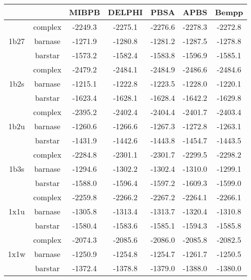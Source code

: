 \documentclass[11pt]{article}
\begin{document}
\begin{table*}[]
     \centering
     \begin{tabular}{cc|c|c|c|c|c}
                           &         & MIBPB   & DELPHI  & PBSA    & APBS    & Bempp   \\ \hline
     \multirow{3}{*}{1b27} & complex & -2249.3 & -2275.1 & -2276.6 & -2278.3 & -2272.8 \\
                           & barnase & -1271.9 & -1280.8 & -1281.2 & -1287.5 & -1278.8 \\
                           & barstar & -1573.2 & -1582.4 & -1583.8 & -1596.9 & -1585.1 \\ \hline
     \multirow{3}{*}{1b2s} & complex & -2479.2 & -2484.1 & -2484.9 & -2486.6 & -2484.6 \\
                           & barnase & -1215.1 & -1222.8 & -1223.5 & -1228.0 & -1220.1 \\
                           & barstar & -1623.4 & -1628.1 & -1628.4 & -1642.2 & -1629.8 \\ \hline
     \multirow{3}{*}{1b2u} & complex & -2395.2 & -2402.4 & -2404.4 & -2401.7 & -2403.4 \\
                           & barnase & -1260.6 & -1266.6 & -1267.3 & -1272.8 & -1263.1 \\
                           & barstar & -1431.9 & -1442.6 & -1443.8 & -1454.7 & -1443.5 \\ \hline
     \multirow{3}{*}{1b3s} & complex & -2284.8 & -2301.1 & -2301.7 & -2299.5 & -2298.2 \\
                           & barnase & -1294.6 & -1302.2 & -1302.4 & -1310.0 & -1299.1 \\
                           & barstar & -1588.0 & -1596.4 & -1597.2 & -1609.3 & -1599.0 \\ \hline
     \multirow{3}{*}{1x1u} & complex & -2259.8 & -2266.2 & -2267.2 & -2264.1 & -2266.1 \\
                           & barnase & -1305.8 & -1313.4 & -1313.7 & -1320.4 & -1310.8 \\
                           & barstar & -1580.4 & -1583.6 & -1585.1 & -1594.3 & -1585.8 \\ \hline
     \multirow{3}{*}{1x1w} & complex & -2074.3 & -2085.6 & -2086.0 & -2085.8 & -2082.5 \\
                           & barnase & -1250.9 & -1254.8 & -1254.7 & -1261.7 & -1250.5 \\
                           & barstar & -1372.4 & -1378.8 & -1379.0 & -1388.0 & -1380.0 \\ \hline

\end{tabular}
\end{table*}
\end{document}
